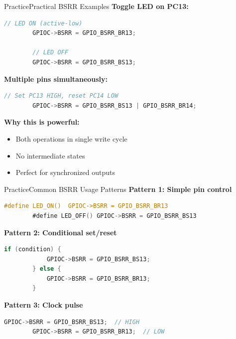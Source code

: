 \documentclass{beamer}
\begin{document}
\begin{frame}[fragile]{Practice}{Practical BSRR Examples}
	\textbf{Toggle LED on PC13:}
	\begin{lstlisting}[language=C, basicstyle=\ttfamily\footnotesize]
		// LED ON (active-low)
		GPIOC->BSRR = GPIO_BSRR_BR13;
		
		// LED OFF
		GPIOC->BSRR = GPIO_BSRR_BS13;
	\end{lstlisting}
	
	\textbf{Multiple pins simultaneously:}
	\begin{lstlisting}[language=C, basicstyle=\ttfamily\footnotesize]
		// Set PC13 HIGH, reset PC14 LOW
		GPIOC->BSRR = GPIO_BSRR_BS13 | GPIO_BSRR_BR14;
	\end{lstlisting}
	
	\textbf{Why this is powerful:}
	\begin{itemize}
		\item Both operations in single write cycle
		\item No intermediate states
		\item Perfect for synchronized outputs
	\end{itemize}
\end{frame}
\begin{frame}[fragile]{Practice}{Common BSRR Usage Patterns}
	\textbf{Pattern 1: Simple pin control}
	\begin{lstlisting}[language=C, basicstyle=\ttfamily\footnotesize]
		#define LED_ON()  GPIOC->BSRR = GPIO_BSRR_BR13
		#define LED_OFF() GPIOC->BSRR = GPIO_BSRR_BS13
	\end{lstlisting}
	
	\textbf{Pattern 2: Conditional set/reset}
	\begin{lstlisting}[language=C, basicstyle=\ttfamily\footnotesize]
		if (condition) {
			GPIOC->BSRR = GPIO_BSRR_BS13;
		} else {
			GPIOC->BSRR = GPIO_BSRR_BR13;
		}
	\end{lstlisting}
	
	\textbf{Pattern 3: Clock pulse}
	\begin{lstlisting}[language=C, basicstyle=\ttfamily\footnotesize]
		GPIOC->BSRR = GPIO_BSRR_BS13;  // HIGH
		GPIOC->BSRR = GPIO_BSRR_BR13;  // LOW
	\end{lstlisting}
\end{frame}
\end{document}
